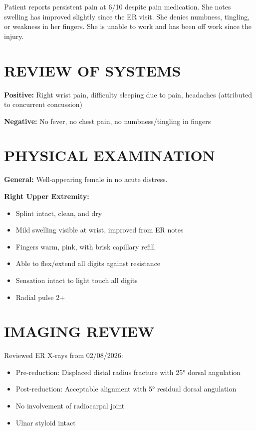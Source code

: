 \documentclass[11pt]{article}
\begin{document}
Patient reports persistent pain at 6/10 despite pain medication. She notes swelling has improved slightly since the ER visit. She denies numbness, tingling, or weakness in her fingers. She is unable to work and has been off work since the injury.

\section*{REVIEW OF SYSTEMS}

\textbf{Positive:} Right wrist pain, difficulty sleeping due to pain, headaches (attributed to concurrent concussion)

\textbf{Negative:} No fever, no chest pain, no numbness/tingling in fingers

\section*{PHYSICAL EXAMINATION}

\textbf{General:} Well-appearing female in no acute distress.

\textbf{Right Upper Extremity:}
\begin{itemize}[nosep]
\item Splint intact, clean, and dry
\item Mild swelling visible at wrist, improved from ER notes
\item Fingers warm, pink, with brisk capillary refill
\item Able to flex/extend all digits against resistance
\item Sensation intact to light touch all digits
\item Radial pulse 2+
\end{itemize}

\section*{IMAGING REVIEW}

Reviewed ER X-rays from 02/08/2026:
\begin{itemize}[nosep]
\item Pre-reduction: Displaced distal radius fracture with 25° dorsal angulation
\item Post-reduction: Acceptable alignment with 5° residual dorsal angulation
\item No involvement of radiocarpal joint
\item Ulnar styloid intact
\end{itemize}
\end{document}
